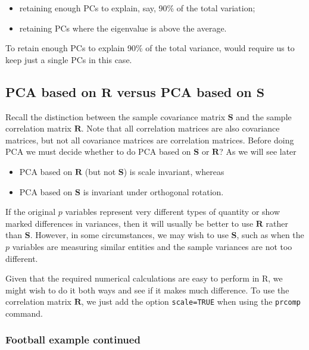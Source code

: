 \documentclass[]{book}
\providecommand{\tightlist}{%
  \setlength{\itemsep}{0pt}\setlength{\parskip}{0pt}}
\theoremstyle{definition}
\theoremstyle{definition}
\theoremstyle{definition}
\theoremstyle{remark}
\begin{document}
\begin{itemize}
\tightlist
\item
  retaining enough PCs to explain, say, 90\% of the total variation;
\item
  retaining PCs where the eigenvalue is above the average.
\end{itemize}

To retain enough PCs to explain 90\% of the total variance, would require us to keep just a single PCs in this case.

\hypertarget{pcawithR}{%
\subsection{\texorpdfstring{PCA based on \(\mathbf R\) versus PCA based on \(\mathbf S\)}{PCA based on \textbackslash{}mathbf R versus PCA based on \textbackslash{}mathbf S}}\label{pcawithR}}

Recall the distinction between the sample covariance matrix \(\mathbf S\) and the sample correlation matrix \(\mathbf R\).
Note that all correlation matrices are also covariance matrices, but not all covariance matrices are correlation matrices.
Before doing PCA we must decide whether to do PCA based on \(\mathbf S\) or \(\mathbf R\)? As we will see later

\begin{itemize}
\tightlist
\item
  PCA based on \(\mathbf R\) (but not \(\mathbf S\)) is scale invariant, whereas
\item
  PCA based on \(\mathbf S\) is invariant under orthogonal rotation.
\end{itemize}

If the original \(p\) variables represent very different types of quantity or show marked differences in variances, then it will usually be better to use \(\mathbf R\) rather than \(\mathbf S\). However, in some circumstances, we may wish to use \(\mathbf S\), such as when the \(p\) variables are measuring similar entities and the sample variances are not too different.

Given that the required numerical calculations are easy to perform in R, we might wish to do it both ways and see if it makes much difference. To use the correlation matrix \(\mathbf R\), we just add the option \texttt{scale=TRUE} when using the \texttt{prcomp} command.

\hypertarget{football-example-continued}{%
\subsubsection{Football example continued}\label{football-example-continued}}
\end{document}
